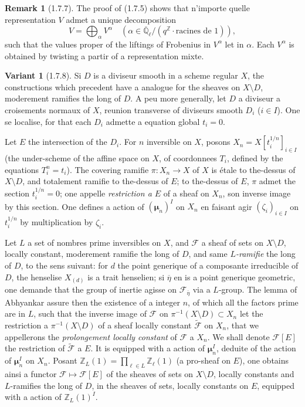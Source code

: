 \documentclass[12pt,a4paper]{article}
\theoremstyle{plain}
\theoremstyle{definition}
\newtheorem{remark}[theorem]{Remark}
\newtheorem{var}[theorem]{Variant}
\theoremstyle{definition}
\theoremstyle{remark}
\begin{document}
\begin{remark}[1.7.7]
The proof of (1.7.5) shows that n'importe quelle representation $V$ admet a unique decomposition
\[V = \bigoplus_\alpha V^\alpha \quad (\alpha \in \overline{\mathbb{Q}}_\ell / (q^\mathbb{Z} \cdot \text{racines de } 1)),\]
such that the values proper of the liftings of Frobenius in $V^\alpha$ let in $\alpha$. Each $V^\alpha$ is obtained by twisting a partir of a representation mixte.
\end{remark}

\begin{var}[1.7.8]
Si $D$ is a diviseur smooth in a scheme regular $X$, the constructions which precedent have a analogue for the sheaves on $X \setminus D$, moderement ramifies the long of $D$. A peu more generally, let $D$ a diviseur a croisements normaux of $X$, reunion transverse of diviseurs smooth $D_i$ ($i \in I$). One se localise, for that each $D_i$ admette a equation global $t_i = 0$.

Let $E$ the intersection of the $D_i$. For $n$ inversible on $X$, posons $X_n = X[t_i^{1/n}]_{i \in I}$ (the under-scheme of the affine space on $X$, of coordonnees $T_i$, defined by the equations $T_i^n = t_i$). The covering ramifie $\pi: X_n \to X$ of $X$ is étale to the-dessus of $X \setminus D$, and totalement ramifie to the-dessus of $E$; to the-dessus of $E$, $\pi$ admet the section $t_i^{1/n} = 0$; one appelle \emph{restriction a $E$} of a sheaf on $X_n$, son inverse image by this section. One defines a action of $(\boldsymbol{\mu}_n)^I$ on $X_n$ en faisant agir $(\zeta_i)_{i \in I}$ on $t_i^{1/n}$ by multiplication by $\zeta_i$.

Let $L$ a set of nombres prime inversibles on $X$, and $\mathscr{F}$ a sheaf of sets on $X \setminus D$, locally constant, moderement ramifie the long of $D$, and same $L$\emph{-ramifie} the long of $D$, to the sens suivant: for $d$ the point generique of a composante irreducible of $D$, the henselise $X_{(d)}$ is a trait henselien; si $\overline{\eta}$ en is a point generique geometric, one demande that the group of inertie agisse on $\mathscr{F}_{\overline{\eta}}$ via a $L$-group. The lemma of Abhyankar assure then the existence of a integer $n$, of which all the factors prime are in $L$, such that the inverse image of $\mathscr{F}$ on $\pi^{-1}(X \setminus D) \subset X_n$ let the restriction a $\pi^{-1}(X \setminus D)$ of a sheaf locally constant $\widetilde{\mathscr{F}}$ on $X_n$, that we appellerons the \emph{prolongement locally constant} of $\mathscr{F}$ a $X_n$. We shall denote $\mathscr{F}[E]$ the restriction of $\widetilde{\mathscr{F}}$ a $E$. It is equipped with a action of $\boldsymbol{\mu}_n^I$, deduite of the action of $\boldsymbol{\mu}_n^I$ on $X_n$. Posant $\mathbb{Z}_L(1) = \prod_{\ell \in L} \mathbb{Z}_\ell(1)$ (a pro-sheaf on $E$), one obtains ainsi a functor $\mathscr{F} \mapsto \mathscr{F}[E]$ of the sheaves of sets on $X \setminus D$, locally constants and $L$-ramifies the long of $D$, in the sheaves of sets, locally constants on $E$, equipped with a action of $\mathbb{Z}_L(1)^I$.


\end{var}
\end{document}
